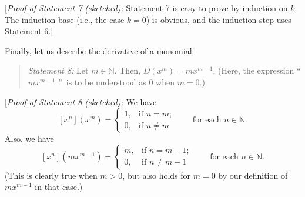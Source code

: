 \documentclass[paper=a4, fontsize=12pt]{scrartcl}%
\theoremstyle{plainsl}
\theoremstyle{definition}
\theoremstyle{remark}
\newenvironment{statement}{\begin{quote}}{\end{quote}}
\begin{document}
[\textit{Proof of Statement 7 (sketched):} Statement 7 is easy to prove by
induction on $k$. The induction base (i.e., the case $k=0$) is obvious, and
the induction step uses Statement 6.]

\bigskip

Finally, let us describe the derivative of a monomial:

\begin{statement}
\textit{Statement 8:} Let $m\in\mathbb{N}$. Then, $D\left(  x^{m}\right)
=mx^{m-1}$. (Here, the expression \textquotedblleft$mx^{m-1}$%
\textquotedblright\ is to be understood as $0$ when $m=0$.)
\end{statement}

[\textit{Proof of Statement 8 (sketched):} We have%
\begin{equation}
\left[  x^{n}\right]  \left(  x^{m}\right)  =%
\begin{cases}
1, & \text{if }n=m;\\
0, & \text{if }n\neq m
\end{cases}
\qquad\text{for each }n\in\mathbb{N}. \label{sol.pol.diff1.s8.pf.1}%
\end{equation}
Also, we have%
\begin{equation}
\left[  x^{n}\right]  \left(  mx^{m-1}\right)  =%
\begin{cases}
m, & \text{if }n=m-1;\\
0, & \text{if }n\neq m-1
\end{cases}
\qquad\text{for each }n\in\mathbb{N}. \label{sol.pol.diff1.s8.pf.2}%
\end{equation}
(This is clearly true when $m>0$, but also holds for $m=0$ by our definition
of $mx^{m-1}$ in that case.)
\end{document}
